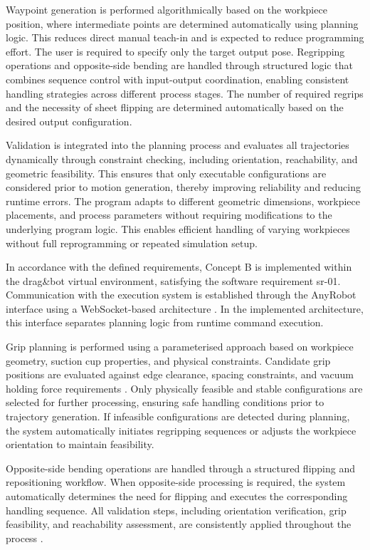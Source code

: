 Waypoint generation is performed algorithmically based on the workpiece position, where intermediate points are determined automatically using planning logic. This reduces direct manual teach-in and is expected to reduce programming effort. The user is required to specify only the target output pose. Regripping operations and opposite-side bending are handled through structured logic that combines sequence control with input-output coordination, enabling consistent handling strategies across different process stages. The number of required regrips and the necessity of sheet flipping are determined automatically based on the desired output configuration.

Validation is integrated into the planning process and evaluates all trajectories dynamically through constraint checking, including orientation, reachability, and geometric feasibility. This ensures that only executable configurations are considered prior to motion generation, thereby improving reliability and reducing runtime errors. The program adapts to different geometric dimensions, workpiece placements, and process parameters without requiring modifications to the underlying program logic. This enables efficient handling of varying workpieces without full reprogramming or repeated simulation setup.

In accordance with the defined requirements, Concept B is implemented within the drag\&bot virtual environment, satisfying the software requirement \acs{sr}-01. Communication with the execution system is established through the AnyRobot interface using a WebSocket-based architecture \cite{dragandbot_anyrobot_2025}. In the implemented architecture, this interface separates planning logic from runtime command execution.

Grip planning is performed using a parameterised approach based on workpiece geometry, suction cup properties, and physical constraints. Candidate grip positions are evaluated against edge clearance, spacing constraints, and vacuum holding force requirements \cite{VacuumGripperModeling}. Only physically feasible and stable configurations are selected for further processing, ensuring safe handling conditions prior to trajectory generation. If infeasible configurations are detected during planning, the system automatically initiates regripping sequences or adjusts the workpiece orientation to maintain feasibility.

Opposite-side bending operations are handled through a structured flipping and repositioning workflow. When opposite-side processing is required, the system automatically determines the need for flipping and executes the corresponding handling sequence. All validation steps, including orientation verification, grip feasibility, and reachability assessment, are consistently applied throughout the process \cite{Gupta1998SheetMetalBending}.

